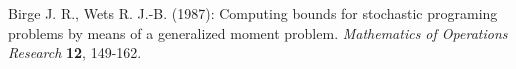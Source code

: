 \begin{thebibliography}{99}

    Birge J. R., Wets R. J.-B. (1987): Computing bounds for stochastic programing problems by means of a generalized moment problem. \textit{Mathematics of Operations Research} \textbf{12}, 149-162.
    \end{thebibliography}